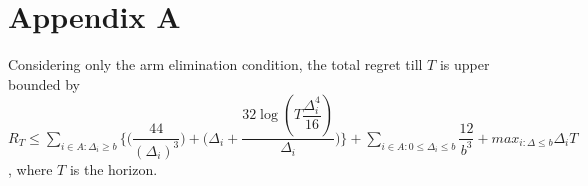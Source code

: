 



\section{Appendix A}
\begin{proposition}
Considering only the arm elimination condition, the total regret till $T$ is upper bounded by $R_{T}\leq \sum_{i\in A:\Delta_{i}\geq b}\bigg \lbrace \bigg(\dfrac{44}{(\Delta_{i})^{3}}\bigg) + \bigg(\Delta_{i}+\dfrac{32\log{(T\dfrac{\Delta_{i}^{4}}{16})}}{\Delta_{i}}\bigg)\bigg\rbrace + \sum_{i\in A:0\leq\Delta_{i}\leq b}\dfrac{12}{b^{3}} + max_{i:\Delta\leq b}\Delta_{i}T$, where $T$ is the horizon.
\end{proposition}

